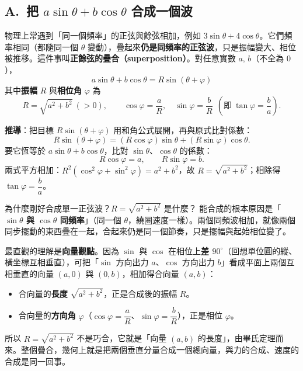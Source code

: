 \documentclass[11pt]{article}
\begin{document}
\subsection*{\sffamily A.\ 把 $a\sin\theta+b\cos\theta$ 合成一個波}

物理上常遇到「同一個頻率」的正弦與餘弦相加，例如 $3\sin\theta+4\cos\theta$。它們頻率相同（都隨同一個 $\theta$ 變動），疊起來\textbf{仍是同頻率的正弦波}，只是振幅變大、相位被推移。這件事叫\textbf{正餘弦的疊合（superposition）}。對任意實數 $a,\,b$（不全為 $0$），
$$\boxed{\;a\sin\theta+b\cos\theta=R\sin(\theta+\varphi)\;}$$
其中\textbf{振幅} $R$ 與\textbf{相位角} $\varphi$ 為
$$R=\sqrt{a^2+b^2}\ (>0),\qquad \cos\varphi=\frac{a}{R},\quad\sin\varphi=\frac{b}{R}\ \ \left(\text{即}\ \tan\varphi=\frac{b}{a}\right).$$


\textbf{推導}：把目標 $R\sin(\theta+\varphi)$ 用和角公式展開，再與原式比對係數：
$$R\sin(\theta+\varphi)=(R\cos\varphi)\sin\theta+(R\sin\varphi)\cos\theta.$$
要它恆等於 $a\sin\theta+b\cos\theta$，比對 $\sin\theta$、$\cos\theta$ 的係數：
$$R\cos\varphi=a,\qquad R\sin\varphi=b.$$
兩式平方相加：$R^2(\cos^2\varphi+\sin^2\varphi)=a^2+b^2$，故 $R=\sqrt{a^2+b^2}$；相除得 $\tan\varphi=\dfrac{b}{a}$。

\begin{補充框}{為什麼剛好合成單一正弦波？$R=\sqrt{a^2+b^2}$ 是什麼？}
能合成的根本原因是「\textbf{$\sin\theta$ 與 $\cos\theta$ 同頻率}」（同一個 $\theta$，繞圈速度一樣）。兩個同頻波相加，就像兩個同步擺動的東西疊在一起，合起來仍是同一個節奏，只是擺幅與起始相位變了。

最直觀的理解是\textbf{向量觀點}。因為 $\sin$ 與 $\cos$ 在相位上\textbf{差 $90^\circ$}（回想單位圓的縱、橫坐標互相垂直），可把「$\sin$ 方向出力 $a$、$\cos$ 方向出力 $b$」看成平面上兩個互相垂直的向量 $(a,0)$ 與 $(0,b)$，相加得合向量 $(a,b)$：
\begin{itemize}\setlength{\itemsep}{1pt}
\item 合向量的\textbf{長度} $\sqrt{a^2+b^2}$，正是合成後的振幅 $R$。
\item 合向量的\textbf{方向角} $\varphi$（$\cos\varphi=\dfrac{a}{R}$、$\sin\varphi=\dfrac{b}{R}$），正是相位 $\varphi$。
\end{itemize}
所以 $R=\sqrt{a^2+b^2}$ 不是巧合，它就是「向量 $(a,b)$ 的長度」，由畢氏定理而來。整個疊合，幾何上就是把兩個垂直分量合成一個總向量，與力的合成、速度的合成是同一回事。
\end{補充框}
\end{document}
